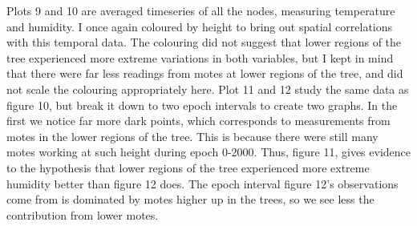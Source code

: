 \documentclass[english]{article}\usepackage[]{graphicx}\usepackage[]{color}
\begin{document}
Plots 9 and 10 are averaged timeseries of all the nodes, measuring temperature and humidity.  I once again coloured by height to bring out spatial correlations with this temporal data.  The colouring did not suggest that lower regions of the tree experienced more extreme variations in both variables, but I kept in mind that there were far less readings from motes at lower regions of the tree, and did not scale the colouring appropriately here.  Plot 11 and 12 study the same data as figure 10, but break it down to two epoch intervals to create two graphs.  In the first we notice far more dark points, which corresponds to measurements from motes in the lower regions of the tree.  This is because there were still many motes working at such height during epoch 0-2000.  Thus, figure 11, gives evidence to the hypothesis that lower regions of the tree experienced more extreme humidity better than figure 12 does.  The epoch interval figure 12's observations come from   is dominated by motes higher up in the trees, so we see less the contribution from lower motes.    
\end{document}
